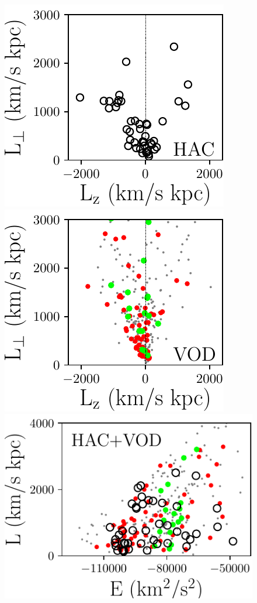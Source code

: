 \documentclass[a4paper,useAMS,usenatbib]{mnras}
\begin{document}
%
   \begin{figure}
	        \includegraphics[scale=0.40352]{HAC_Lz_Lp.pdf}
	    \includegraphics[scale=0.40352]{VOD_Lz_Lp.pdf}
        \includegraphics[scale=0.40352]{E_L.pdf}

\end{figure}
\end{document}
